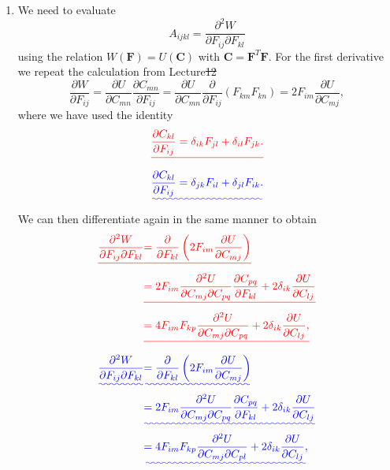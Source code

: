 \documentclass[a4paper,10pt]{paper}
\providecommand{\DIFadd}[1]{{\protect\color{blue}\uwave{#1}}} %
\providecommand{\DIFdel}[1]{{\protect\color{red}\sout{#1}}}                      %
\providecommand{\DIFaddbegin}{} %
\providecommand{\DIFaddend}{} %
\providecommand{\DIFdelbegin}{} %
\providecommand{\DIFdelend}{} %
\begin{document}
\begin{enumerate}
\item We need to evaluate
\begin{equation*}
    A_{ijkl}=\frac{\partial^{2}W}{\partial F_{ij}\partial F_{kl}}
\end{equation*}
using the relation $W(\mathbf{F})=U(\mathbf{C})$ with $\mathbf{C}=\mathbf{F}^{T}\mathbf{F}$. For the first derivative we repeat the calculation from Lecture\DIFdelbegin \DIFdel{12
}\DIFdelend \DIFaddbegin \DIFadd{~14
}\DIFaddend \begin{equation*}
    \frac{\partial W}{\partial F_{ij}}=\frac{\partial U}{\partial C_{mn}}\frac{\partial C_{mn}}{\partial F_{ij}}=\frac{\partial U}{\partial C_{mn}}\frac{\partial}{\partial F_{ij}}(F_{km}F_{kn})=2F_{im}\frac{\partial U}{\partial C_{mj}},
\end{equation*}
where we have used the identity
\DIFdelbegin \begin{displaymath}
    \DIFdel{\frac{\partial C_{kl}}{\partial F_{ij}}=\delta_{ik}F_{jl}+\delta_{il}F_{jk}.
}\end{displaymath}%
\DIFdelend \DIFaddbegin \begin{equation*}
    \DIFadd{\frac{\partial C_{kl}}{\partial F_{ij}}=\delta_{jk}F_{il}+\delta_{jl}F_{ik}.
}\end{equation*}\DIFaddend 
We can then differentiate again in the same manner to obtain
\DIFdelbegin \begin{eqnarray*}
    \DIFdel{\frac{\partial^2 W}{\partial F_{ij}\partial F_{kl}} }&\DIFdel{= \frac{\partial}{\partial F_{kl}}\left(2F_{im}\frac{\partial U}{\partial C_{mj}}\right) }\\
    &\DIFdel{= 2F_{im}\frac{\partial^{2}U}{\partial C_{mj}\partial C_{pq}}\frac{\partial C_{pq}}{\partial F_{kl}}+2\delta_{ik}\frac{\partial U}{\partial C_{lj}} }\\
    &\DIFdel{= 4F_{im}F_{kp}\frac{\partial^{2}U}{\partial C_{mj}\partial C_{pq}}+2\delta_{ik}\frac{\partial U}{\partial C_{lj}},
}\end{eqnarray*}%
\DIFdelend \DIFaddbegin \begin{align*}
    \DIFadd{\frac{\partial^2 W}{\partial F_{ij}\partial F_{kl}} }&\DIFadd{= \frac{\partial}{\partial F_{kl}}\left(2F_{im}\frac{\partial U}{\partial C_{mj}}\right) }\\
    &\DIFadd{= 2F_{im}\frac{\partial^{2}U}{\partial C_{mj}\partial C_{pq}}\frac{\partial C_{pq}}{\partial F_{kl}}+2\delta_{ik}\frac{\partial U}{\partial C_{lj}} }\\
    &\DIFadd{= 4F_{im}F_{kp}\frac{\partial^{2}U}{\partial C_{mj}\partial C_{pl}}+2\delta_{ik}\frac{\partial U}{\partial C_{lj}},
}
\end{align*}
\end{enumerate}
\end{document}
